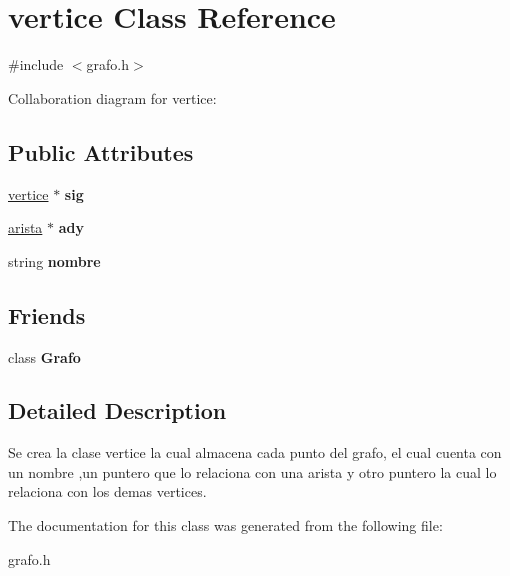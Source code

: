 \hypertarget{classvertice}{}\section{vertice Class Reference}
\label{classvertice}


{\ttfamily \#include $<$grafo.\+h$>$}



Collaboration diagram for vertice\+:
\subsection*{Public Attributes}
\begin{DoxyCompactItemize}
\item 
\mbox{\label{classvertice_addb735fcb1d28652d452815539b66d46}} 
\hyperlink{classvertice}{vertice} $\ast$ {\bfseries sig}
\item 
\mbox{\label{classvertice_aa4d9a6d649b488af68be0ba52a5a7aff}} 
\hyperlink{classarista}{arista} $\ast$ {\bfseries ady}
\item 
\mbox{\label{classvertice_af1014731b89374968e28ecbf06a05de1}} 
string {\bfseries nombre}
\end{DoxyCompactItemize}
\subsection*{Friends}
\begin{DoxyCompactItemize}
\item 
\mbox{\label{classvertice_aa89bd7919924d99b99ffa9ab271175a3}} 
class {\bfseries Grafo}
\end{DoxyCompactItemize}


\subsection{Detailed Description}
Se crea la clase vertice la cual almacena cada punto del grafo, el cual cuenta con un nombre ,un puntero que lo relaciona con una arista y otro puntero la cual lo relaciona con los demas vertices. 

The documentation for this class was generated from the following file\+:\begin{DoxyCompactItemize}
\item 
grafo.\+h\end{DoxyCompactItemize}
